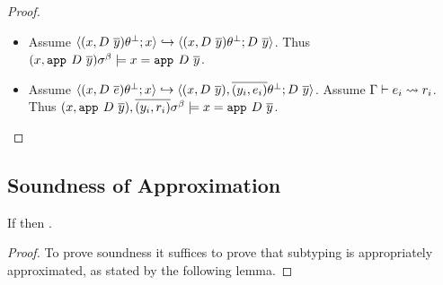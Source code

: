 \begin{proof}
\begin{itemize}
\item 
Assume
	$\track{(x, D\ \overline{y})\tsub{}}{x}
	\hookrightarrow
	\track{(x, D\ \overline{y})\tsub{}}{D\ \overline{y}}$.
Thus  
  $(x,\texttt{app}^{}_{}\ {D}\ {\overline{y}})\sigma^\beta 
    \models x = \texttt{app}^{}_{}\ {D}\ {\overline{y}}$. 

\item 
Assume
	$\track{(x, D\ \overline{e})\tsub{}}{x}
	\hookrightarrow
	\track{(x, D\ \overline{y}), \overline{(y_i, e_i)}\tsub{}}{D\ \overline{y}}$.
Assume 
  $ \Gamma\vdash e_i \rightsquigarrow r_i $.
Thus  
  $(x,\texttt{app}^{}_{}\ {D}\ {\overline{y}}), \overline{(y_i, r_i)}\sigma^\beta 
    \models x = \texttt{app}^{}_{}\ {D}\ {\overline{y}}$. 
\end{itemize}
\end{proof}

\subsection{Soundness of Approximation}
%
\begin{theorem}
If  then .
\end{theorem}
%
\begin{proof}
To prove soundness it suffices to prove that subtyping is appropriately approximated, 
as stated by the following lemma.
\end{proof}

